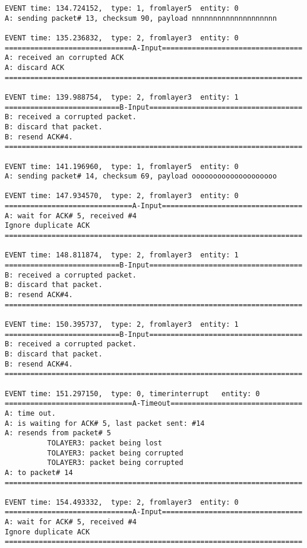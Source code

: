 \documentclass[12pt]{article}
\begin{document}
\begin{verbatim}
EVENT time: 134.724152,  type: 1, fromlayer5  entity: 0
A: sending packet# 13, checksum 90, payload nnnnnnnnnnnnnnnnnnnn

EVENT time: 135.236832,  type: 2, fromlayer3  entity: 0
==============================A-Input=================================
A: received an corrupted ACK 
A: discard ACK
======================================================================

EVENT time: 139.988754,  type: 2, fromlayer3  entity: 1
===========================B-Input====================================
B: received a corrupted packet.
B: discard that packet.
B: resend ACK#4.
======================================================================

EVENT time: 141.196960,  type: 1, fromlayer5  entity: 0
A: sending packet# 14, checksum 69, payload oooooooooooooooooooo

EVENT time: 147.934570,  type: 2, fromlayer3  entity: 0
==============================A-Input=================================
A: wait for ACK# 5, received #4
Ignore duplicate ACK
======================================================================

EVENT time: 148.811874,  type: 2, fromlayer3  entity: 1
===========================B-Input====================================
B: received a corrupted packet.
B: discard that packet.
B: resend ACK#4.
======================================================================

EVENT time: 150.395737,  type: 2, fromlayer3  entity: 1
===========================B-Input====================================
B: received a corrupted packet.
B: discard that packet.
B: resend ACK#4.
======================================================================

EVENT time: 151.297150,  type: 0, timerinterrupt   entity: 0
==============================A-Timeout===============================
A: time out. 
A: is waiting for ACK# 5, last packet sent: #14
A: resends from packet# 5 
          TOLAYER3: packet being lost
          TOLAYER3: packet being corrupted
          TOLAYER3: packet being corrupted
A: to packet# 14
======================================================================

EVENT time: 154.493332,  type: 2, fromlayer3  entity: 0
==============================A-Input=================================
A: wait for ACK# 5, received #4
Ignore duplicate ACK
======================================================================


\end{verbatim}
\end{document}
